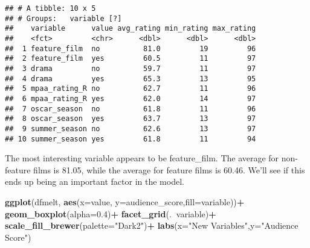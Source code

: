 \documentclass[]{article}
\newenvironment{Shaded}{\begin{snugshade}}{\end{snugshade}}
\newcommand{\KeywordTok}[1]{\textcolor[rgb]{0.13,0.29,0.53}{\textbf{#1}}}
\newcommand{\DataTypeTok}[1]{\textcolor[rgb]{0.13,0.29,0.53}{#1}}
\newcommand{\DecValTok}[1]{\textcolor[rgb]{0.00,0.00,0.81}{#1}}
\newcommand{\FloatTok}[1]{\textcolor[rgb]{0.00,0.00,0.81}{#1}}
\newcommand{\StringTok}[1]{\textcolor[rgb]{0.31,0.60,0.02}{#1}}
\newcommand{\OperatorTok}[1]{\textcolor[rgb]{0.81,0.36,0.00}{\textbf{#1}}}
\newcommand{\NormalTok}[1]{#1}
\begin{document}
\begin{Shaded}
\end{Shaded}

\begin{verbatim}
## # A tibble: 10 x 5
## # Groups:   variable [?]
##    variable      value avg_rating min_rating max_rating
##    <fct>         <chr>      <dbl>      <dbl>      <dbl>
##  1 feature_film  no          81.0         19         96
##  2 feature_film  yes         60.5         11         97
##  3 drama         no          59.7         11         97
##  4 drama         yes         65.3         13         95
##  5 mpaa_rating_R no          62.7         11         96
##  6 mpaa_rating_R yes         62.0         14         97
##  7 oscar_season  no          61.8         11         96
##  8 oscar_season  yes         63.7         13         97
##  9 summer_season no          62.6         13         97
## 10 summer_season yes         61.8         11         94
\end{verbatim}

The most interesting variable appears to be feature\_film. The average
for non-feature films is 81.05, while the average for feature films is
60.46. We'll see if this ends up being an important factor in the model.

\begin{Shaded}
\begin{Highlighting}[]
\KeywordTok{ggplot}\NormalTok{(dfmelt, }\KeywordTok{aes}\NormalTok{(}\DataTypeTok{x=}\NormalTok{value, }\DataTypeTok{y=}\NormalTok{audience_score,}\DataTypeTok{fill=}\NormalTok{variable))}\OperatorTok{+}
\StringTok{  }\KeywordTok{geom_boxplot}\NormalTok{(}\DataTypeTok{alpha=}\FloatTok{0.4}\NormalTok{)}\OperatorTok{+}
\StringTok{  }\KeywordTok{facet_grid}\NormalTok{(.}\OperatorTok{~}\NormalTok{variable)}\OperatorTok{+}
\StringTok{  }\KeywordTok{scale_fill_brewer}\NormalTok{(}\DataTypeTok{palette=}\StringTok{"Dark2"}\NormalTok{)}\OperatorTok{+}
\StringTok{  }\KeywordTok{labs}\NormalTok{(}\DataTypeTok{x=}\StringTok{"New Variables"}\NormalTok{,}\DataTypeTok{y=}\StringTok{"Audience Score"}\NormalTok{)}
\end{Highlighting}
\end{Shaded}
\end{document}
